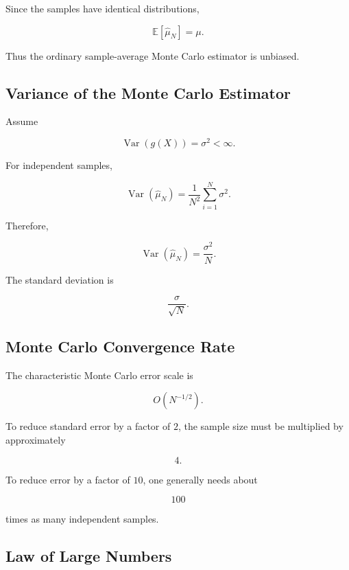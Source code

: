 Since the samples have identical distributions,

\[
\boxed{
\mathbb{E}
[
\widehat{\mu}_N
]
=
\mu.
}
\]

Thus the ordinary sample-average Monte Carlo estimator is unbiased.

\subsection{Variance of the Monte Carlo Estimator}
\label{subsec:mc-estimator-variance}

Assume

\[
\operatorname{Var}(g(X))
=
\sigma^2
<
\infty.
\]

For independent samples,

\[
\operatorname{Var}
(
\widehat{\mu}_N
)
=
\frac1{N^2}
\sum_{i=1}^{N}
\sigma^2.
\]

Therefore,

\[
\boxed{
\operatorname{Var}
(
\widehat{\mu}_N
)
=
\frac{
\sigma^2
}{
N
}.
}
\]

The standard deviation is

\[
\boxed{
\frac{\sigma}{\sqrt{N}}.
}
\]

\subsection{Monte Carlo Convergence Rate}
\label{subsec:mc-convergence-rate}

The characteristic Monte Carlo error scale is

\[
\boxed{
O(N^{-1/2}).
}
\]

To reduce standard error by a factor of \(2\), the sample size must be
multiplied by approximately

\[
\boxed{
4.
}
\]

To reduce error by a factor of \(10\), one generally needs about

\[
\boxed{
100
}
\]

times as many independent samples.

\subsection{Law of Large Numbers}
\label{subsec:mc-law-large-numbers}

